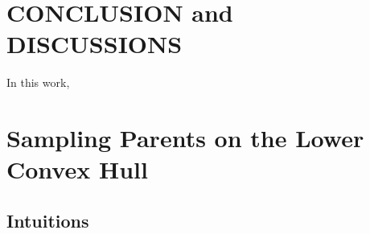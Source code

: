 \section{CONCLUSION and DISCUSSIONS}
\label{sec:conclusion}
In this work, 

%
%
%
%
\section{Sampling Parents on the Lower Convex Hull}
\label{sec:appendix_parent_choice}

\subsection{Intuitions}
\label{sec:candidate_parent_intuition}

